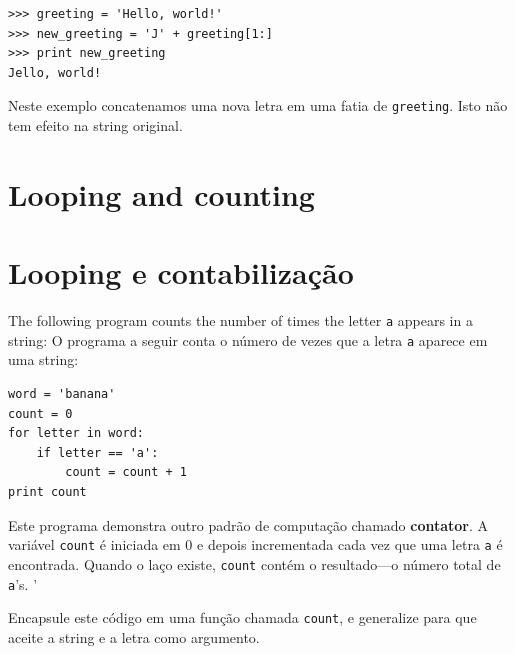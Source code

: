 {\beforeverb
\begin{verbatim}
>>> greeting = 'Hello, world!'
>>> new_greeting = 'J' + greeting[1:]
>>> print new_greeting
Jello, world!
\end{verbatim}
\afterverb
%
%
Neste exemplo concatenamos uma nova letra em uma fatia de {\tt greeting}.
Isto não tem efeito na string original.


\section{Looping and counting}
\section{Looping e contabilização}
\label{counter}
\label{contador}


The following program counts the number of times the letter {\tt a}
appears in a string:
O programa a seguir conta o número de vezes que a letra {\tt a} aparece em
uma string:

\beforeverb
\begin{verbatim}
word = 'banana'
count = 0
for letter in word:
    if letter == 'a':
        count = count + 1
print count
\end{verbatim}
\afterverb
%
%
Este programa demonstra outro padrão de computação chamado {\bf contator}. A
variável {\tt count} é iniciada em 0 e depois incrementada cada vez que uma
letra {\tt a} é encontrada. Quando o laço existe, {\tt count} contém o
resultado---o número total de {\tt a}'s.
'
\begin{ex}

Encapsule este código em uma função chamada {\tt count}, e generalize para
que aceite a string e a letra como argumento.
\end{ex}

}
